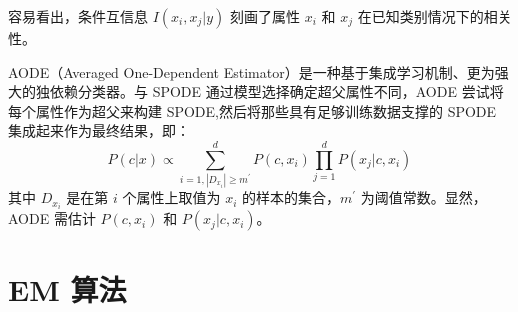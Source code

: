 \documentclass[12pt, a4paper]{article} %
\begin{document}
容易看出，条件互信息 $I(x_i, x_j | y)$ 刻画了属性 $x_i$ 和 $x_j$ 在已知类别情况下的相关性。

AODE（Averaged One-Dependent Estimator）是一种基于集成学习机制、更为强大的独依赖分类器。与 SPODE 通过模型选择确定超父属性不同，AODE 尝试将每个属性作为超父来构建 SPODE,然后将那些具有足够训练数据支撑的 SPODE 集成起来作为最终结果，即：
\begin{equation*}
    P(c | x) \propto \sum_{i = 1, |D_{x_i}| \ge m^{\prime}}^{d} P(c, x_i) \prod_{j = 1}^{d} P(x_j | c, x_i)
\end{equation*}
其中 $D_{x_i}$ 是在第 $i$ 个属性上取值为 $x_i$ 的样本的集合，$m^\prime$ 为阈值常数。显然，AODE 需估计 $P(c, x_i)$ 和 $P(x_j | c, x_i)$。

\section{EM 算法}
\end{document}
